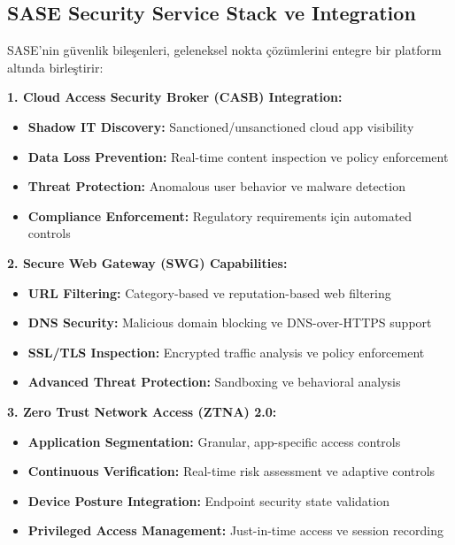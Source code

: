 \subsection{SASE Security Service Stack ve Integration}

SASE'nin güvenlik bileşenleri, geleneksel nokta çözümlerini entegre bir platform altında birleştirir:

\textbf{1. Cloud Access Security Broker (CASB) Integration:}
\begin{itemize}
    \item \textbf{Shadow IT Discovery:} Sanctioned/unsanctioned cloud app visibility
    \item \textbf{Data Loss Prevention:} Real-time content inspection ve policy enforcement
    \item \textbf{Threat Protection:} Anomalous user behavior ve malware detection
    \item \textbf{Compliance Enforcement:} Regulatory requirements için automated controls
\end{itemize}

\textbf{2. Secure Web Gateway (SWG) Capabilities:}
\begin{itemize}
    \item \textbf{URL Filtering:} Category-based ve reputation-based web filtering
    \item \textbf{DNS Security:} Malicious domain blocking ve DNS-over-HTTPS support
    \item \textbf{SSL/TLS Inspection:} Encrypted traffic analysis ve policy enforcement
    \item \textbf{Advanced Threat Protection:} Sandboxing ve behavioral analysis
\end{itemize}

\textbf{3. Zero Trust Network Access (ZTNA) 2.0:}
\begin{itemize}
    \item \textbf{Application Segmentation:} Granular, app-specific access controls
    \item \textbf{Continuous Verification:} Real-time risk assessment ve adaptive controls
    \item \textbf{Device Posture Integration:} Endpoint security state validation
    \item \textbf{Privileged Access Management:} Just-in-time access ve session recording
\end{itemize}

